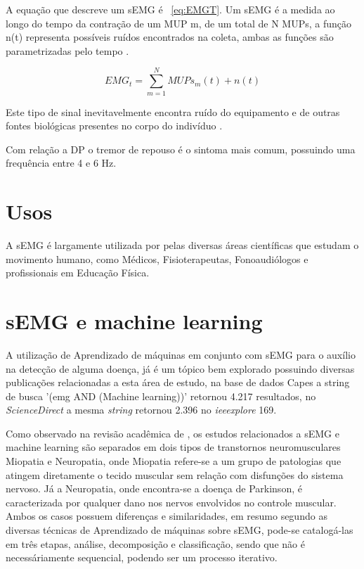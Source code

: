 A equação que descreve um sEMG é ~\ref{eq:EMGT}. Um sEMG é a medida ao longo do tempo da contração de um MUP m, de um total de N MUPs, a função n(t) representa possíveis ruídos encontrados na coleta, ambas as funções são parametrizadas pelo tempo \cite{yousefi2014characterizing}.

\begin{equation} \label{eq:EMGT}
    EMG_{t} =\sum_{m=1}^{N} MUPs_{m}(t)+n(t)
\end{equation}

Este tipo de sinal inevitavelmente encontra ruído do equipamento e de outras fontes biológicas presentes no corpo do indivíduo \cite{yousefi2014characterizing}.

Com relação a DP o tremor de repouso é o sintoma mais comum, possuindo uma frequência entre 4 e 6 Hz.
\cite{jankovic2008parkinson}

\section{Usos}
A sEMG é largamente utilizada por pelas diversas áreas científicas que estudam o movimento humano, como Médicos, Fisioterapeutas, Fonoaudiólogos e profissionais em Educação Física\cite{nascimento2012surface}.

\section{sEMG e machine learning}
A utilização de Aprendizado de máquinas em conjunto com sEMG para o auxílio na detecção de alguma doença, já é um tópico bem explorado possuindo diversas publicações relacionadas a esta área de estudo, na base de dados Capes a string de busca '(emg AND (Machine learning))' retornou 4.217 resultados, no \textit{ScienceDirect} a mesma \textit{string} retornou 2.396 no \textit{ieeexplore} 169.

Como observado na revisão acadêmica de \cite{yousefi2014characterizing}, os estudos relacionados a sEMG e machine learning são separados em  dois tipos de transtornos neuromusculares Miopatia e Neuropatia, onde Miopatia refere-se a um grupo de patologias que atingem diretamente o tecido muscular sem relação com disfunções do sistema nervoso. Já a Neuropatia, onde encontra-se a doença de Parkinson, é caracterizada por qualquer dano nos nervos envolvidos no controle muscular. Ambos os casos possuem diferenças e similaridades, em resumo segundo \cite{yousefi2014characterizing} as diversas técnicas de Aprendizado de máquinas sobre sEMG, pode-se catalogá-las em três etapas, análise, decomposição e classificação, sendo que não é necessáriamente sequencial, podendo ser um processo iterativo.

